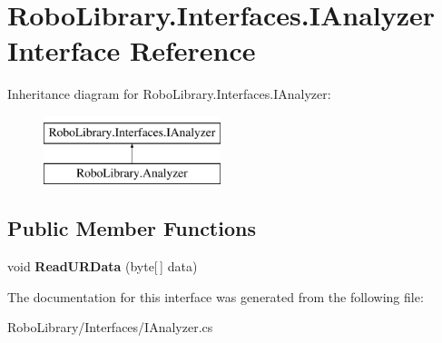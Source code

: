 \hypertarget{interface_robo_library_1_1_interfaces_1_1_i_analyzer}{}\section{Robo\+Library.\+Interfaces.\+I\+Analyzer Interface Reference}
\label{interface_robo_library_1_1_interfaces_1_1_i_analyzer}
Inheritance diagram for Robo\+Library.\+Interfaces.\+I\+Analyzer\+:\begin{figure}[H]
\begin{center}
\leavevmode
\includegraphics[height=2.000000cm]{interface_robo_library_1_1_interfaces_1_1_i_analyzer}
\end{center}
\end{figure}
\subsection*{Public Member Functions}
\begin{DoxyCompactItemize}
\item 
\hypertarget{interface_robo_library_1_1_interfaces_1_1_i_analyzer_ad1279c13ad39ca2b5fd7002158684910}{}\label{interface_robo_library_1_1_interfaces_1_1_i_analyzer_ad1279c13ad39ca2b5fd7002158684910} 
void {\bfseries Read\+U\+R\+Data} (byte\mbox{[}$\,$\mbox{]} data)
\end{DoxyCompactItemize}


The documentation for this interface was generated from the following file\+:\begin{DoxyCompactItemize}
\item 
Robo\+Library/\+Interfaces/I\+Analyzer.\+cs\end{DoxyCompactItemize}

